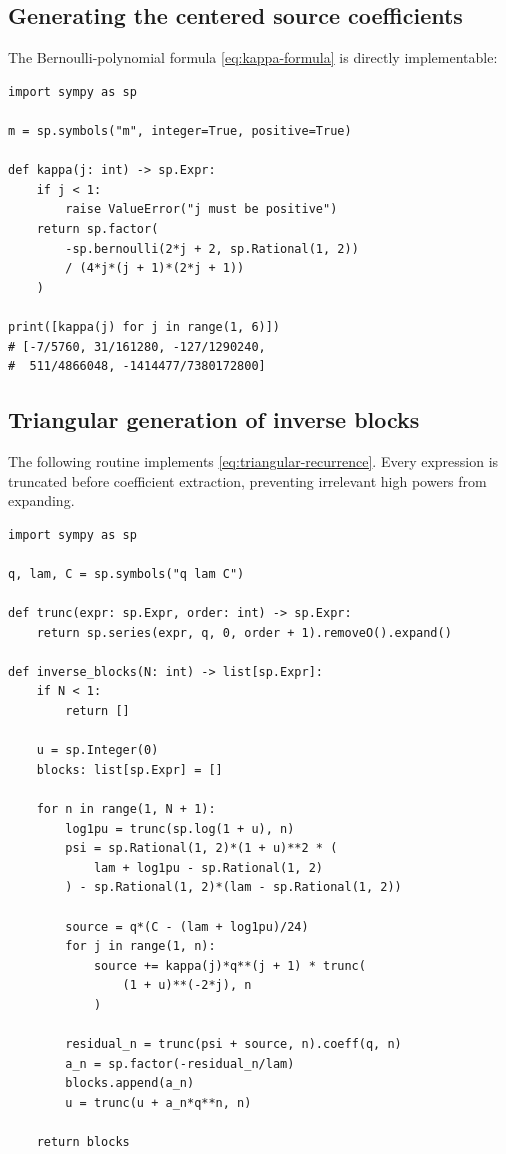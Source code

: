 \documentclass[11pt,oneside]{article}
\theoremstyle{plain}
\theoremstyle{definition}
\theoremstyle{remark}
\begin{document}
\subsection{Generating the centered source coefficients}

The Bernoulli-polynomial formula \cref{eq:kappa-formula} is directly
implementable:

\begin{lstlisting}
import sympy as sp

m = sp.symbols("m", integer=True, positive=True)

def kappa(j: int) -> sp.Expr:
    if j < 1:
        raise ValueError("j must be positive")
    return sp.factor(
        -sp.bernoulli(2*j + 2, sp.Rational(1, 2))
        / (4*j*(j + 1)*(2*j + 1))
    )

print([kappa(j) for j in range(1, 6)])
# [-7/5760, 31/161280, -127/1290240,
#  511/4866048, -1414477/7380172800]
\end{lstlisting}

\subsection{Triangular generation of inverse blocks}

The following routine implements \cref{eq:triangular-recurrence}.  Every
expression is truncated before coefficient extraction, preventing irrelevant
high powers from expanding.

\begin{lstlisting}
import sympy as sp

q, lam, C = sp.symbols("q lam C")

def trunc(expr: sp.Expr, order: int) -> sp.Expr:
    return sp.series(expr, q, 0, order + 1).removeO().expand()

def inverse_blocks(N: int) -> list[sp.Expr]:
    if N < 1:
        return []

    u = sp.Integer(0)
    blocks: list[sp.Expr] = []

    for n in range(1, N + 1):
        log1pu = trunc(sp.log(1 + u), n)
        psi = sp.Rational(1, 2)*(1 + u)**2 * (
            lam + log1pu - sp.Rational(1, 2)
        ) - sp.Rational(1, 2)*(lam - sp.Rational(1, 2))

        source = q*(C - (lam + log1pu)/24)
        for j in range(1, n):
            source += kappa(j)*q**(j + 1) * trunc(
                (1 + u)**(-2*j), n
            )

        residual_n = trunc(psi + source, n).coeff(q, n)
        a_n = sp.factor(-residual_n/lam)
        blocks.append(a_n)
        u = trunc(u + a_n*q**n, n)

    return blocks
\end{lstlisting}
\end{document}
